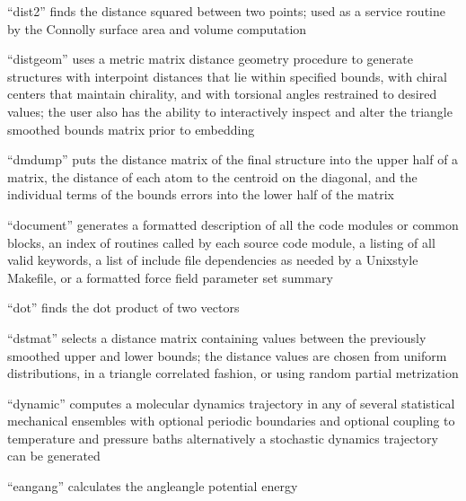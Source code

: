 \documentclass[letterpaper,11pt,english]{sphinxmanual}
\begin{document}

“dist2” finds the distance squared between two points; used as a service routine by the Connolly surface area and volume computation


“distgeom” uses a metric matrix distance geometry procedure to generate structures with interpoint distances that lie within specified bounds, with chiral centers that maintain chirality, and with torsional angles restrained to desired values; the user also has the ability to interactively inspect and alter the triangle smoothed bounds matrix prior to embedding


“dmdump” puts the distance matrix of the final structure into the upper half of a matrix, the distance of each atom to the centroid on the diagonal, and the individual terms of the bounds errors into the lower half of the matrix


“document” generates a formatted description of all the code modules or common blocks, an index of routines called by each source code module, a listing of all valid keywords, a list of include file dependencies as needed by a Unix\sphinxhyphen{}style Makefile, or a formatted force field parameter set summary


“dot” finds the dot product of two vectors


“dstmat” selects a distance matrix containing values between the previously smoothed upper and lower bounds; the distance values are chosen from uniform distributions, in a triangle correlated fashion, or using random partial metrization


“dynamic” computes a molecular dynamics trajectory in any of several statistical mechanical ensembles with optional periodic boundaries and optional coupling to temperature and pressure baths alternatively a stochastic dynamics trajectory can be generated


“eangang” calculates the angle\sphinxhyphen{}angle potential energy

\end{document}
